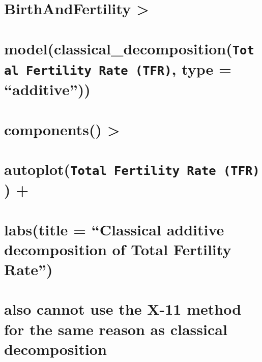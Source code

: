 \documentclass[
]{article}
\begin{document}
\section{BirthAndFertility
\textbar\textgreater{}}\label{birthandfertility}

\section{\texorpdfstring{model(classical\_decomposition(\texttt{Total\ Fertility\ Rate\ (TFR)},
type =
``additive''))}{model(classical\_decomposition(Total Fertility Rate (TFR), type = ``additive''))}}\label{modelclassical_decompositiontotal-fertility-rate-tfr-type-additive}

\section{components() \textbar\textgreater{}}\label{components}

\section{\texorpdfstring{autoplot(\texttt{Total\ Fertility\ Rate\ (TFR)})
+}{autoplot(Total Fertility Rate (TFR)) +}}\label{autoplottotal-fertility-rate-tfr}

\section{labs(title = ``Classical additive decomposition of Total
Fertility
Rate'')}\label{labstitle-classical-additive-decomposition-of-total-fertility-rate}

\section{also cannot use the X-11 method for the same reason as
classical
decomposition}\label{also-cannot-use-the-x-11-method-for-the-same-reason-as-classical-decomposition}
\end{document}
